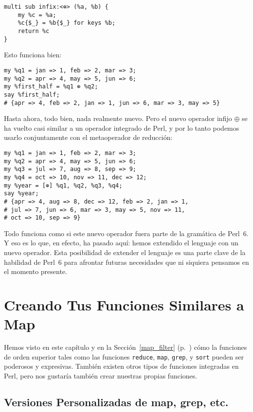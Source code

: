 \begin{verbatim}
multi sub infix:<⊕> (%a, %b) {
    my %c = %a;
    %c{$_} = %b{$_} for keys %b;
    return %c
}
\end{verbatim}

Esto funciona bien:

\begin{verbatim}
my %q1 = jan => 1, feb => 2, mar => 3;
my %q2 = apr => 4, may => 5, jun => 6;
my %first_half = %q1 ⊕ %q2;
say %first_half;
# {apr => 4, feb => 2, jan => 1, jun => 6, mar => 3, may => 5}
\end{verbatim}

Hasta ahora, todo bien, nada realmente nuevo. Pero el 
nuevo operador infijo $\oplus$ se ha vuelto casi similar a
un operador integrado de Perl, y por lo tanto podemos
usarlo conjuntamente con el metaoperador de reducción:

\begin{verbatim}
my %q1 = jan => 1, feb => 2, mar => 3;
my %q2 = apr => 4, may => 5, jun => 6;
my %q3 = jul => 7, aug => 8, sep => 9;
my %q4 = oct => 10, nov => 11, dec => 12;
my %year = [⊕] %q1, %q2, %q3, %q4;
say %year;
# {apr => 4, aug => 8, dec => 12, feb => 2, jan => 1, 
# jul => 7, jun => 6, mar => 3, may => 5, nov => 11, 
# oct => 10, sep => 9}
\end{verbatim}

Todo funciona como si este nuevo operador fuera parte
de la gramática de Perl~6. Y eso es lo que, en efecto, ha pasado
aquí: hemos extendido el lenguaje con un nuevo operador.
Esta posibilidad de extender el lenguaje es una parte clave de
la habilidad de Perl~6 para afrontar futuras necesidades que
ni siquiera pensamos en el momento presente.

\section{Creando Tus Funciones Similares a Map}

Hemos visto en este capítulo y en la Sección~\ref{map_filter} (p.~\pageref{map_filter}) 
cómo la funciones de orden superior tales como las funciones
{\tt reduce}, {\tt map}, {\tt grep}, y {\tt sort} pueden ser 
poderosos y expresivas. También existen otros tipos de funciones
integradas en Perl, pero nos gustaría también crear nuestras 
propias funciones.


\subsection{Versiones Personalizadas de map, grep, etc.}

